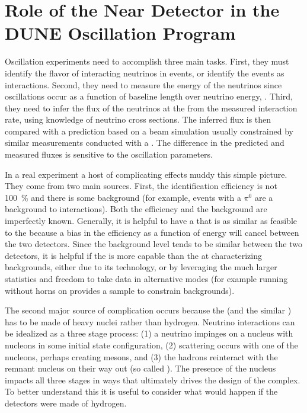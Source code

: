 \section{Role of the Near Detector in the DUNE Oscillation Program}
\label{sec:exsum-nd-role}

Oscillation experiments need to accomplish three main tasks. First, they must identify the flavor of interacting neutrinos in  events, or identify the events as  interactions. Second, they need to measure the energy of the neutrinos since oscillations occur as a function of baseline length over neutrino energy, . Third, they need to infer the flux of the neutrinos at the  from the measured interaction rate, using knowledge of neutrino cross sections. The inferred flux is then compared with a prediction based on a beam simulation usually constrained by similar measurements conducted with a  . The difference in the predicted and measured fluxes is sensitive to the oscillation parameters.

In a real experiment %
a host of complicating effects %
muddy this simple picture. They come from two main sources. First, the identification efficiency is not \SI{100}{\%} and there is 
some background (for example,  events with a $\pi^0$ are a background to \nue {} interactions). Both the efficiency and the background are imperfectly known. Generally, it is helpful to have a   that is as similar as feasible to the   because a bias in the efficiency as a function of energy will cancel between the two detectors. Since the background level tends to be similar between the two detectors, it is helpful if the  is more capable than the  at characterizing backgrounds, either due to its technology, or by leveraging the much larger statistics and freedom to take data in alternative modes (for example running without horns on provides a sample to constrain  backgrounds).

The second major source of complication occurs because the  (and the similar ) has to be made of heavy nuclei rather than hydrogen. Neutrino interactions can be idealized as a three stage process: (1) a neutrino impinges on a nucleus with nucleons in some initial state configuration, (2) scattering occurs with one of the nucleons, perhaps creating mesons, and (3) the hadrons reinteract with the remnant nucleus on their way out (so called ). The presence of the nucleus impacts all three stages in ways that ultimately drives the design of the   complex. To better understand this it is useful to consider what would happen if the detectors were made of hydrogen.


